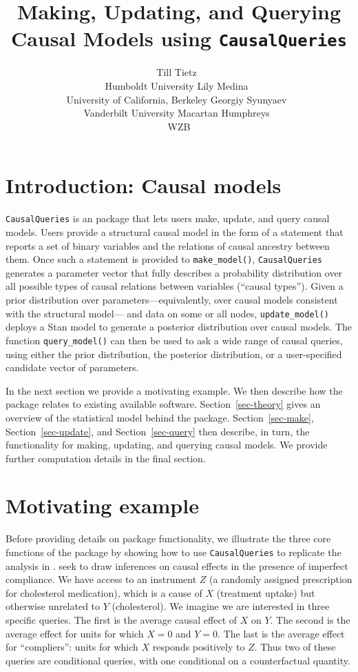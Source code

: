 \documentclass[
  11pt,
  article]{jss}
\author{Till Tietz~\orcidlink{0000-0002-2916-9059}\\Humboldt
University \And Lily Medina~\orcidlink{0009-0004-2423-524X}\\University
of California, Berkeley \AND Georgiy
Syunyaev~\orcidlink{0000-0002-4391-6313}\\Vanderbilt
University \And Macartan Humphreys~\orcidlink{0000-0001-7029-2326}\\WZB}
\title{Making, Updating, and Querying Causal Models using
\texttt{CausalQueries}}
\begin{document}
\maketitle

\section{Introduction: Causal models}\label{sec-intro}

\texttt{CausalQueries} is an  package that lets users make,
update, and query causal models. Users provide a structural causal model
in the form of a statement that reports a set of binary variables and
the relations of causal ancestry between them. Once such a statement is
provided to \texttt{make\_model()}, \texttt{CausalQueries} generates a
parameter vector that fully describes a probability distribution over
all possible types of causal relations between variables (``causal
types''). Given a prior distribution over parameters---equivalently,
over causal models consistent with the structural model--- and data on
some or all nodes, \texttt{update\_model()} deploys a Stan
\citep{carpenter_stan_2017} model to generate a posterior distribution
over causal models. The function \texttt{query\_model()} can then be
used to ask a wide range of causal queries, using either the prior
distribution, the posterior distribution, or a user-specified candidate
vector of parameters.

In the next section we provide a motivating example. We then describe
how the package relates to existing available software.
Section~\ref{sec-theory} gives an overview of the statistical model
behind the package. Section~\ref{sec-make}, Section~\ref{sec-update},
and Section~\ref{sec-query} then describe, in turn, the functionality
for making, updating, and querying causal models. We provide further
computation details in the final section.

\section{Motivating example}\label{motivating-example}

Before providing details on package functionality, we illustrate the
three core functions of the package by showing how to use
\texttt{CausalQueries} to replicate the analysis in
\citetext{\citealp{chickering_clinicians_1996}; \citealp[see
also][]{humphreys_integrated_2023}}. \citet{chickering_clinicians_1996}
seek to draw inferences on causal effects in the presence of imperfect
compliance. We have access to an instrument \(Z\) (a randomly assigned
prescription for cholesterol medication), which is a cause of \(X\)
(treatment uptake) but otherwise unrelated to \(Y\) (cholesterol). We
imagine we are interested in three specific queries. The first is the
average causal effect of \(X\) on \(Y\). The second is the average
effect for units for which \(X=0\) and \(Y=0\). The last is the average
effect for ``compliers'': units for which \(X\) responds positively to
\(Z\). Thus two of these queries are conditional queries, with one
conditional on a counterfactual quantity.
\end{document}
